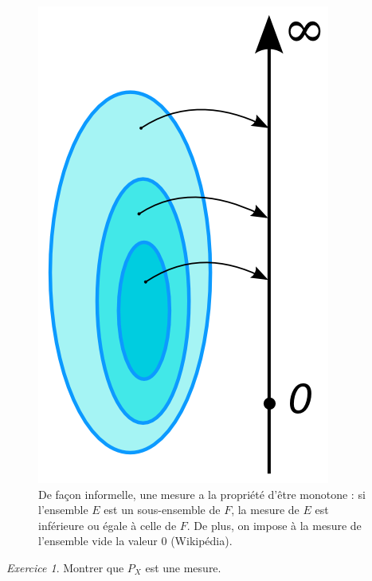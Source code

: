 \documentclass[french]{book}
\theoremstyle{definition}
\theoremstyle{remark}
\newtheorem{exo}{Exercice}
\begin{document}
\begin{figure}[h!]
  \centering
  \includegraphics[scale=0.3]{figures/Measure_illustration.png}
  \caption{De façon informelle, une mesure a la propriété d'être monotone : si l'ensemble $ E$ est un sous-ensemble de $ F$, la mesure de $ E$ est inférieure ou égale à celle de $ F$. De plus, on impose à la mesure de l'ensemble vide la valeur 0 (Wikipédia).}
  \label{}
\end{figure}

\begin{exo}
  Montrer que $P_X$ est une mesure.
\end{exo}
\end{document}
